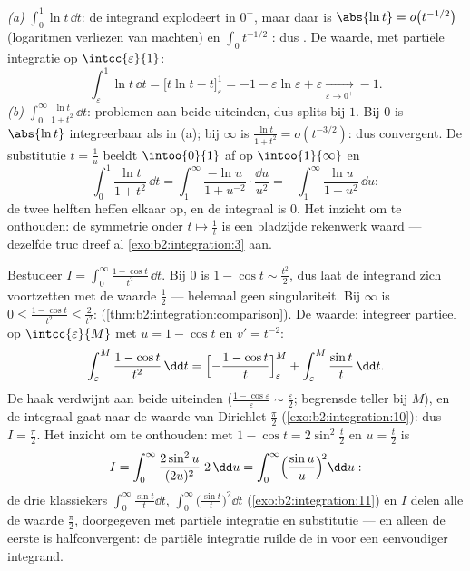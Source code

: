 \begin{example}\label{ex:b2:integration:warmups}
\emph{(a)} $\displaystyle\int_0^1 \ln t\,\dd t$: de integrand
explodeert in $0^+$, maar daar is $\abs{\ln t} =
o\bigl(t^{-1/2}\bigr)$ (logaritmen verliezen van machten) en
$\int_0 t^{-1/2}$ : dus . De
waarde, met partiële integratie op $\intcc{\varepsilon}{1}$:
\[
\int_\varepsilon^1 \ln t\,\dd t
= \bigl[t\ln t - t\bigr]_\varepsilon^1
= -1 - \varepsilon\ln\varepsilon + \varepsilon
\xrightarrow[\varepsilon\to0^+]{} -1 .
\]
\emph{(b)} $\displaystyle\int_0^\infty \frac{\ln t}{1 +
t^2}\,\dd t$: problemen aan beide uiteinden, dus splits bij $1$.
Bij $0$ is $\abs{\ln t}$ integreerbaar als in (a); bij $\infty$ is
$\frac{\ln t}{1+t^2} = o(t^{-3/2})$: dus  convergent. De
substitutie $t = \frac1u$ beeldt $\intoo{0}{1}$ af op
$\intoo{1}{\infty}$ en
\[
\int_0^1 \frac{\ln t}{1+t^2}\,\dd t
= \int_1^{\infty} \frac{-\ln u}{1 + u^{-2}}\cdot
\frac{\dd u}{u^2}
= -\int_1^\infty \frac{\ln u}{1+u^2}\,\dd u :
\]
de twee helften heffen elkaar op, en de integraal is $0$. Het
inzicht om te onthouden: de symmetrie onder $t \mapsto \frac1t$ is
een bladzijde rekenwerk waard --- dezelfde truc dreef al
\cref{exo:b2:integration:3} aan.
\end{example}

\begin{example}\label{ex:b2:integration:onecos}
Bestudeer $I = \displaystyle\int_0^{\infty} \frac{1 - \cos
t}{t^2}\,\dd t$. Bij $0$ is $1 - \cos t \sim \frac{t^2}2$, dus
laat de integrand zich  voortzetten met de waarde $\frac12$
--- helemaal geen singulariteit. Bij $\infty$ is $0 \leq \frac{1 -
\cos t}{t^2} \leq \frac{2}{t^2}$: 
(\cref{thm:b2:integration:comparison}). De waarde: integreer
partieel op $\intcc{\varepsilon}{M}$ met $u = 1 - \cos t$ en $v' =
t^{-2}$:
\[
\int_\varepsilon^M \frac{1 - \cos t}{t^2}\,\dd t
= \Bigl[-\frac{1 - \cos t}{t}\Bigr]_\varepsilon^M
+ \int_\varepsilon^M \frac{\sin t}{t}\,\dd t .
\]
De haak verdwijnt aan beide uiteinden ($\frac{1 -
\cos\varepsilon}{\varepsilon} \sim \frac\varepsilon2$; begrensde
teller bij $M$), en de integraal gaat naar de waarde van Dirichlet
$\frac\pi2$ (\cref{exo:b2:integration:10}): dus $I = \frac\pi2$.
Het inzicht om te onthouden: met $1 - \cos t = 2\sin^2\frac t2$ en
$u = \frac t2$ is
\[
I = \int_0^\infty \frac{2\sin^2 u}{(2u)^2}\;2\,\dd u
= \int_0^\infty \Bigl(\frac{\sin u}{u}\Bigr)^{\!2}\dd u :
\]
de drie klassiekers $\int_0^\infty\frac{\sin t}{t}\dd t$,
$\int_0^\infty\bigl(\frac{\sin t}{t}\bigr)^2\dd t$
(\cref{exo:b2:integration:11}) en $I$ delen alle de waarde
$\frac\pi2$, doorgegeven met partiële integratie en substitutie ---
en alleen de eerste is halfconvergent: de partiële integratie ruilde
de  in voor een eenvoudiger integrand.
\end{example}

